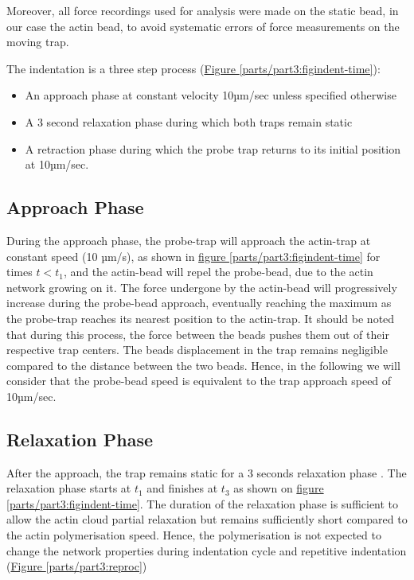 \documentclass[A4paperpaper,11pt,english]{sphinxmanual}
\begin{document}
Moreover, all force
recordings used for analysis were made on the static bead, in our case the actin bead, to avoid systematic errors of force measurements on the moving trap.

The indentation is a three step process (\hyperref[parts/part3:figindent-time]{Figure  \ref*{parts/part3:figindent-time}}):
\begin{itemize}
\item {} 
An approach phase at constant velocity 10µm/sec unless specified otherwise

\item {} 
A 3 second relaxation phase during which both traps remain static

\item {} 
A retraction phase  during which the probe trap returns to its initial position at 10µm/sec.

\end{itemize}


\subsection{Approach Phase}
\label{parts/part3:approach-phase}
During the approach phase, the probe-trap will approach the actin-trap at constant speed (10 µm/s), as shown in
\hyperref[parts/part3:figindent-time]{figure  \ref*{parts/part3:figindent-time}} for times \(t < t_1\), and the actin-bead
will repel the probe-bead, due to the actin network growing on it. The force undergone
by the actin-bead will progressively increase during the probe-bead approach,
eventually reaching the maximum as the probe-trap reaches its nearest position
to the actin-trap. It should be noted that during this process,
the force between the beads pushes  them out of their respective trap centers.
The beads displacement in the trap remains negligible compared to the
distance between the two beads. Hence, in the following we will consider that the probe-bead speed is equivalent to the trap approach speed of 10µm/sec.


\subsection{Relaxation Phase}
\label{parts/part3:relaxation-phase}
After the approach, the trap remains static for a 3 seconds relaxation phase
. The relaxation phase starts at \(t_1\) and
finishes at \(t_3\) as shown on \hyperref[parts/part3:figindent-time]{figure  \ref*{parts/part3:figindent-time}}. The duration of the relaxation phase is sufficient to allow the actin cloud  partial
relaxation but remains sufficiently short compared to
the actin polymerisation speed. Hence, the polymerisation is not expected to
change the network properties during indentation cycle and repetitive indentation (\hyperref[parts/part3:reproc]{Figure  \ref*{parts/part3:reproc}})
\end{document}
